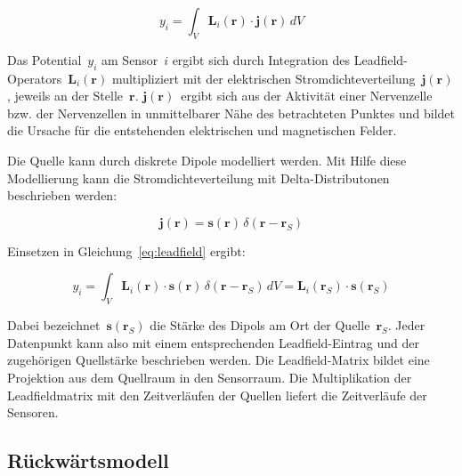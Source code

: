 \documentclass[doc,a4paper,12pt]{apa6}
\newcommand{\mx}[1]{\mathbf{#1}}
\begin{document}
\begin{equation}
y_i = \int_V \mx{L}_i (\mx{r}) \cdot \mx{j} (\mx{r})\, dV
\label{eq:leadfield}
\end{equation}

Das Potential~$y_i$ am Sensor~$i$ ergibt sich durch Integration des Leadfield-Operators~$\mx{L}_i(\mx{r})$ multipliziert mit der elektrischen Stromdichteverteilung~$\mx{j}(\mx{r})$, jeweils an der Stelle~$\mx{r}$. $\mx{j}(\mx{r})$~ergibt sich aus der Aktivität einer Nervenzelle bzw. der Nervenzellen in unmittelbarer Nähe des betrachteten Punktes und bildet die Ursache für die entstehenden elektrischen und magnetischen Felder.

Die Quelle kann durch diskrete Dipole modelliert werden. Mit Hilfe diese Modellierung kann die Stromdichteverteilung mit Delta-Distributonen beschrieben werden:

\begin{equation}
\mx{j} (\mx{r}) = \mx{s}(\mx{r})\,\delta(\mx{r}-\mx{r}_S)
\end{equation}

Einsetzen in Gleichung~\ref{eq:leadfield} ergibt:

\begin{equation}
y_i = \int_V \mx{L}_i (\mx{r}) \cdot \mx{s}(\mx{r})\,\delta(\mx{r}-\mx{r}_S)\, dV = \mx{L}_i(\mx{r}_S) \cdot \mx{s}(\mx{r}_S)
\label{eq:leadfield2}
\end{equation}

Dabei bezeichnet~$\mx{s}(\mx{r}_S)$ die Stärke des Dipols am Ort der Quelle~$\mx{r}_S$. Jeder Datenpunkt kann also mit einem entsprechenden Leadfield-Eintrag und der zugehörigen Quellstärke beschrieben werden. Die Leadfield-Matrix bildet eine Projektion aus dem Quellraum in den Sensorraum. Die Multiplikation der Leadfieldmatrix mit den Zeitverläufen der Quellen liefert die Zeitverläufe der Sensoren.



\subsection{Rückwärtsmodell}
\end{document}
